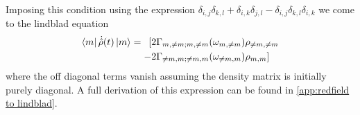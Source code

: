 Imposing this condition using the expression
\(\delta_{i,j}\delta_{k,l}
+ \delta_{i,k}\delta_{j,l}
- \delta_{i,j}\delta_{k,l}
\delta_{i,k}\)
we come to the lindblad
equation
\begin{equation}
    \bra{m}\dot{\hat{\rho}}(t) \ket{m}  = \begin{aligned}[t]
        [ & 2\Gamma_{m,\neq m;m, \neq m}(\omega_{m,\neq m})\rho_{\neq m, \neq m} \\
        - & 2\Gamma_{\neq m,m;\neq m, m}(\omega_{\neq m,m})\rho_{m, m}]
    \end{aligned}
\end{equation}
where the off diagonal
terms vanish assuming the
density matrix is initially
purely diagonal. A full derivation
of this expression can be found in
\cref{app:redfield to lindblad}.



